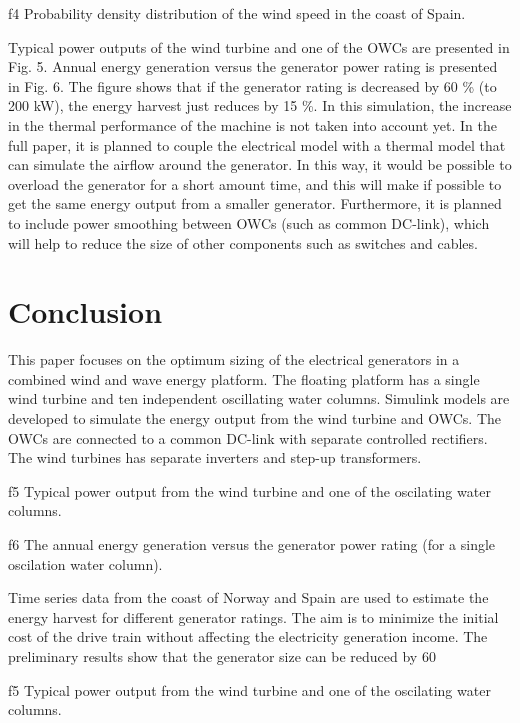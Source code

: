 \documentclass[twocolumn]{article}
\begin{document}
{f4} Probability density distribution of the wind speed in the coast of Spain.

Typical power outputs of the wind turbine and one of the OWCs are presented in Fig. 5. Annual energy generation versus the generator power rating is presented in Fig. 6. The figure shows that if the generator rating is decreased by 60 \% (to 200 kW), the energy harvest just reduces by 15 \%.  In this simulation, the increase in the thermal performance of the machine is not taken into account yet. In the full paper, it is planned to couple the electrical model with a thermal model that can simulate the airflow around the generator. In this way, it would be possible to overload the generator  for a short amount time, and this will make if possible to get the same energy output from a smaller generator. Furthermore, it is planned to include power smoothing between OWCs (such as common DC-link), which will help to reduce the size of other components such as switches and cables.

\section{Conclusion}

This paper focuses on the optimum sizing of the electrical generators in a combined wind and wave energy platform. The floating platform has a single wind turbine and ten independent oscillating water columns. Simulink models are developed to simulate the energy output from the wind turbine and OWCs. The OWCs are connected to a common DC-link with separate controlled rectifiers. The wind turbines has separate inverters and step-up transformers.

{f5} Typical power output from the wind turbine and one of the oscilating water columns.

{f6} The annual energy generation versus the generator power rating (for a single oscilation water column).

Time series data from the coast of Norway and Spain are used to estimate the energy harvest for different generator ratings. The aim is to minimize the initial cost of the drive train without affecting the electricity generation income. The preliminary results show that the generator size can be reduced by 60%

{f5} Typical power output from the wind turbine and one of the oscilating water columns.
\end{document}
